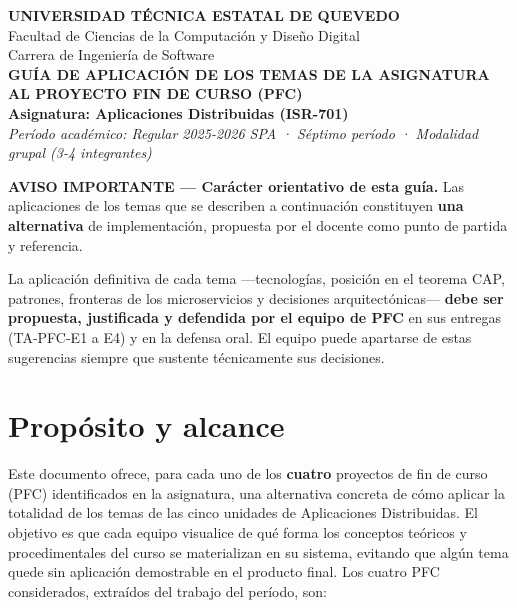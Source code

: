 \documentclass[11pt]{article}
\begin{document}
\begin{center}
{\color{uteqDark}\large\bfseries UNIVERSIDAD TÉCNICA ESTATAL DE QUEVEDO}\\[2pt]
{\normalsize Facultad de Ciencias de la Computación y Diseño Digital}\\[1pt]
{\normalsize Carrera de Ingeniería de Software}\\[14pt]
{\color{uteqDark}\Large\bfseries GUÍA DE APLICACIÓN DE LOS TEMAS DE LA ASIGNATURA}\\[6pt]
{\color{uteqDark}\Large\bfseries AL PROYECTO FIN DE CURSO (PFC)}\\[12pt]
{\large\bfseries Asignatura: Aplicaciones Distribuidas (ISR-701)}\\[3pt]
{\small\itshape Período académico: Regular 2025-2026 SPA · Séptimo período · Modalidad grupal (3-4 integrantes)}
\end{center}
\vspace{6pt}

\begin{tcolorbox}[colback=avisoBg,colframe=avisoBd,boxrule=1pt,arc=2pt,left=8pt,right=8pt,top=6pt,bottom=6pt]
\textbf{AVISO IMPORTANTE --- Carácter orientativo de esta guía.} Las aplicaciones de los temas que se
describen a continuación constituyen \textbf{una alternativa} de implementación, propuesta por el docente
como punto de partida y referencia.\par\smallskip
La aplicación definitiva de cada tema ---tecnologías, posición en el teorema CAP, patrones, fronteras de
los microservicios y decisiones arquitectónicas--- \textbf{debe ser propuesta, justificada y defendida por
el equipo de PFC} en sus entregas (TA-PFC-E1 a E4) y en la defensa oral. El equipo puede apartarse de estas
sugerencias siempre que sustente técnicamente sus decisiones.
\end{tcolorbox}

\section{Propósito y alcance}
Este documento ofrece, para cada uno de los \textbf{cuatro} proyectos de fin de curso (PFC) identificados en
la asignatura, una alternativa concreta de cómo aplicar la totalidad de los temas de las cinco unidades de
Aplicaciones Distribuidas. El objetivo es que cada equipo visualice de qué forma los conceptos teóricos y
procedimentales del curso se materializan en su sistema, evitando que algún tema quede sin aplicación
demostrable en el producto final. Los cuatro PFC considerados, extraídos del trabajo del período, son:
\end{document}

